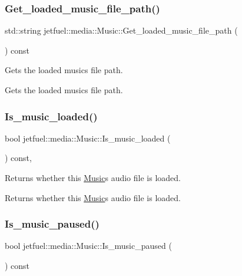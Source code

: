 \subsubsection{\texorpdfstring{Get\+\_\+loaded\+\_\+music\+\_\+file\+\_\+path()}{Get\_loaded\_music\_file\_path()}}
{\footnotesize\ttfamily std\+::string jetfuel\+::media\+::\+Music\+::\+Get\+\_\+loaded\+\_\+music\+\_\+file\+\_\+path (\begin{DoxyParamCaption}{ }\end{DoxyParamCaption}) const\hspace{0.3cm}{\ttfamily [inline]}}



Gets the loaded music\textquotesingle{}s file path. 

Gets the loaded music\textquotesingle{}s file path. \mbox{\label{classjetfuel_1_1media_1_1Music_ac665232356b8b316790e46a3423c158a}} 
\subsubsection{\texorpdfstring{Is\+\_\+music\+\_\+loaded()}{Is\_music\_loaded()}}
{\footnotesize\ttfamily bool jetfuel\+::media\+::\+Music\+::\+Is\+\_\+music\+\_\+loaded (\begin{DoxyParamCaption}{ }\end{DoxyParamCaption}) const\hspace{0.3cm}{\ttfamily [inline]}, {\ttfamily [protected]}}



Returns whether this \hyperlink{classjetfuel_1_1media_1_1Music}{Music}\textquotesingle{}s audio file is loaded. 

Returns whether this \hyperlink{classjetfuel_1_1media_1_1Music}{Music}\textquotesingle{}s audio file is loaded. \mbox{\label{classjetfuel_1_1media_1_1Music_a7ed42b22f467dbcdd8d09da9cff5b034}} 
\subsubsection{\texorpdfstring{Is\+\_\+music\+\_\+paused()}{Is\_music\_paused()}}
{\footnotesize\ttfamily bool jetfuel\+::media\+::\+Music\+::\+Is\+\_\+music\+\_\+paused (\begin{DoxyParamCaption}{ }\end{DoxyParamCaption}) const\hspace{0.3cm}{\ttfamily [inline]}}



